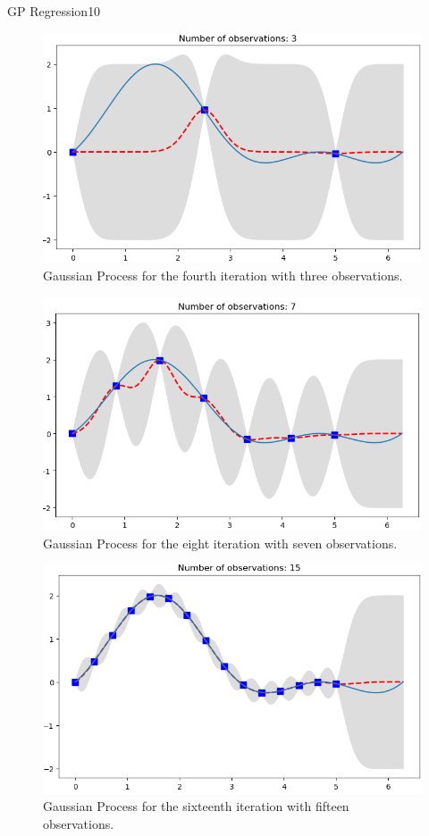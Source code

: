 \begin{questions}
\begin{question}{GP Regression}{10}
\begin{figure}[H]
	\includegraphics[width=0.6\linewidth]{pictures/GP_plot_4.png}
	\centering
	\caption{Gaussian Process for the fourth iteration with three observations.}
	\label{fig:GP_4}
\end{figure}

\begin{figure}[H]
	\includegraphics[width=0.6\linewidth]{pictures/GP_plot_8.png}
	\centering
	\caption{Gaussian Process for the eight iteration with seven observations.}
	\label{fig:GP_8}
\end{figure}

\begin{figure}[H]
	\includegraphics[width=0.6\linewidth]{pictures/GP_plot_16.png}
	\centering
	\caption{Gaussian Process for the sixteenth iteration with fifteen observations.}
	\label{fig:GP_16}
\end{figure}


\end{question}


\end{questions}
